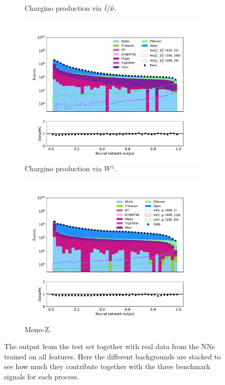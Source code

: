 \begin{figure}[H]
\begin{subfigure}[t!]{0.49\textwidth}
        \caption{Chargino production via $\Tilde{l}/\Tilde{\nu}$.}
        \label{fig:NNdataAllSlepSnu}
    \end{subfigure}      
    \begin{subfigure}[t!]{0.49\textwidth}
        \includegraphics[width = \textwidth]{Figures/Stacked/stackedplot_NN_All_level_WW.pdf}
        \caption{Chargino production via $W^\pm$.}
        \label{fig:NNdataAllWW}
    \end{subfigure}
    \begin{subfigure}[t!]{0.49\textwidth}
        \includegraphics[width = \textwidth]{Figures/Stacked/stackedplot_NN_All_level_monoZ.pdf}
        \caption{Mono-Z.}
        \label{fig:NNdataAllmonoZ}
    \end{subfigure}
    \caption{The output from the test set together with real data from the NNs trained on all features. Here the different backgrounds are stacked to see how much they contribute together with the three benchmark signals for each process.}
    \label{fig:NNdataAll}
\end{figure}

